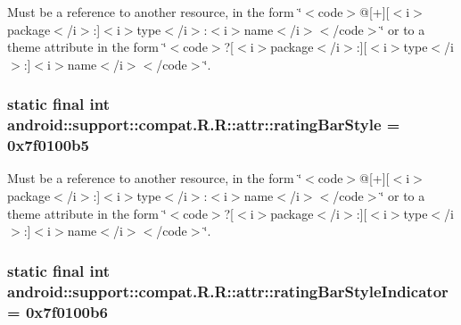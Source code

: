 Must be a reference to another resource, in the form \char`\"{}$<$code$>$@\mbox{[}+\mbox{]}\mbox{[}$<$i$>$package$<$/i$>$:\mbox{]}$<$i$>$type$<$/i$>$:$<$i$>$name$<$/i$>$$<$/code$>$\char`\"{} or to a theme attribute in the form \char`\"{}$<$code$>$?\mbox{[}$<$i$>$package$<$/i$>$:\mbox{]}\mbox{[}$<$i$>$type$<$/i$>$:\mbox{]}$<$i$>$name$<$/i$>$$<$/code$>$\char`\"{}. \hypertarget{classandroid_1_1support_1_1compat_1_1_r_1_1attr_53b1beb7cee970622e929c896f2f6184}{
\subsubsection[{ratingBarStyle}]{\setlength{\rightskip}{0pt plus 5cm}static final int android::support::compat.R.R::attr::ratingBarStyle = 0x7f0100b5}}
\label{classandroid_1_1support_1_1compat_1_1_r_1_1attr_53b1beb7cee970622e929c896f2f6184}


Must be a reference to another resource, in the form \char`\"{}$<$code$>$@\mbox{[}+\mbox{]}\mbox{[}$<$i$>$package$<$/i$>$:\mbox{]}$<$i$>$type$<$/i$>$:$<$i$>$name$<$/i$>$$<$/code$>$\char`\"{} or to a theme attribute in the form \char`\"{}$<$code$>$?\mbox{[}$<$i$>$package$<$/i$>$:\mbox{]}\mbox{[}$<$i$>$type$<$/i$>$:\mbox{]}$<$i$>$name$<$/i$>$$<$/code$>$\char`\"{}. \hypertarget{classandroid_1_1support_1_1compat_1_1_r_1_1attr_4d3bfb5e8f77344c937784d79a2ff4c2}{
\subsubsection[{ratingBarStyleIndicator}]{\setlength{\rightskip}{0pt plus 5cm}static final int android::support::compat.R.R::attr::ratingBarStyleIndicator = 0x7f0100b6}}
\label{classandroid_1_1support_1_1compat_1_1_r_1_1attr_4d3bfb5e8f77344c937784d79a2ff4c2}


